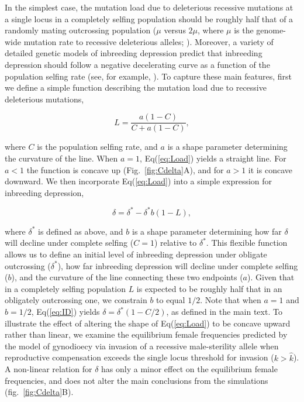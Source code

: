 \documentclass{article}
\begin{document}
In the simplest case, the mutation load due to deleterious recessive mutations at a single locus in a completely selfing population should be roughly half that of a randomly mating outcrossing population ($\mu$ versus $2 \mu$, where $\mu$ is the genome-wide mutation rate to recessive deleterious alleles; \citealt{OhtaCockerham1974}). Moreover, a variety of detailed genetic models of inbreeding depression predict that inbreeding depression should follow a negative decelerating curve as a function of the population selfing rate (see, for example, \citealt{OhtaCockerham1974, LandeSchemske1985, Charlesworth1985, Garcia-Dorado2017, LandePorcher2017}). To capture these main features, first we define a simple function describing the mutation load due to recessive deleterious mutations,

\begin{equation}\label{eq:Load}
    L = \frac{a (1 - C)}{C + a (1 - C)},
\end{equation}

\noindent where $C$ is the population selfing rate, and $a$ is a shape parameter determining the curvature of the line. When $a = 1$, Eq(\ref{eq:Load}) yields a straight line. For $a < 1$ the function is concave up (Fig.~\ref{fig:Cdelta}A), and for $a > 1$ it is concave downward. We then incorporate Eq(\ref{eq:Load}) into a simple expression for inbreeding depression,

\begin{equation}\label{eq:ID}
    \delta = \delta^{\ast} - \delta^{\ast} b (1 - L),
\end{equation}

\noindent where $\delta^\ast$ is defined as above, and $b$ is a shape parameter determining how far $\delta$ will decline under complete selfing ($C = 1$) relative to $\delta^{\ast}$. This flexible function allows us to define an initial level of inbreeding depression under obligate outcrossing ($\delta^\ast$), how far inbreeding depression will decline under complete selfing ($b$), and the curvature of the line connecting these two endpoints ($a$). Given that in a completely selfing population $L$ is expected to be roughly half that in an obligately outcrossing one, we constrain $b$ to equal $1/2$. Note that when $a=1$ and $b=1/2$, Eq(\ref{eq:ID}) yields $\delta = \delta^\ast(1 - C/2)$, as defined in the main text. To illustrate the effect of altering the shape of Eq(\ref{eq:Load}) to be concave upward rather than linear, we examine the equilibrium female frequencies predicted by the model of gynodioecy via invasion of a recessive male-sterility allele when reproductive compensation exceeds the single locus threshold for invasion ($k > \hat{k}$). A non-linear relation for $\delta$ has only a minor effect on the equilibrium female frequencies, and does not alter the main conclusions from the simulations (fig.~\ref{fig:Cdelta}B).
\end{document}
